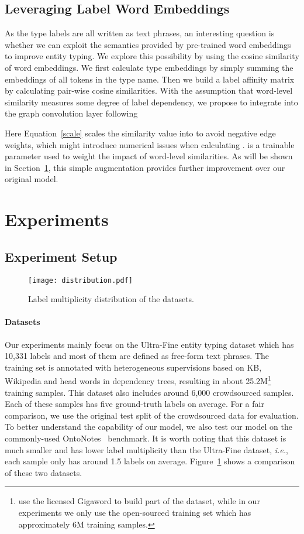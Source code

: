 \documentclass[11pt,a4paper]{article}
\begin{document}
\subsection{Leveraging Label Word Embeddings}
As the type labels are all written as text phrases, an interesting question is whether we can exploit the semantics provided by pre-trained word embeddings to improve entity typing. We explore this possibility by using the cosine similarity of word embeddings. We first calculate type embeddings by simply summing the embeddings of all tokens in the type name. Then we build a label affinity matrix  by calculating pair-wise cosine similarities. With the assumption that word-level similarity measures some degree of label dependency, we propose to integrate  into the graph convolution layer following

Here Equation~\ref{scale} scales the similarity value into  to avoid negative edge weights, which might introduce numerical issues when calculating .  is a trainable parameter used to weight the impact of word-level similarities. As will be shown in Section~\ref{exp}, this simple augmentation provides further improvement over our original model.

\section{Experiments}
\label{exp}
\subsection{Experiment Setup}

\begin{figure}[t]
\centering
\texttt{[image: distribution.pdf]}
\caption{Label multiplicity distribution of the datasets.}
\label{dataset}
\end{figure}

\paragraph{Datasets} Our experiments mainly focus on the Ultra-Fine entity typing dataset which has 10,331 labels and most of them are defined as free-form text phrases. The training set is annotated with heterogeneous supervisions based on KB, Wikipedia and head words in dependency trees, resulting in about 25.2M\footnote{\citet{choi2018ultra} use the licensed Gigaword to build part of the dataset, while in our experiments we only use the open-sourced training set which has approximately 6M training samples.} training samples. This dataset also includes around 6,000 crowdsourced samples. Each of these samples has five ground-truth labels on average. For a fair comparison, we use the original test split of the crowdsourced data for evaluation. To better understand the capability of our model, we also test our model on the commonly-used OntoNotes~\cite{gillick2014context} benchmark. It is worth noting that this dataset is much smaller and has lower label multiplicity than the Ultra-Fine dataset, \emph{i.e.}, each sample only has around 1.5 labels on average. Figure~\ref{dataset} shows a comparison of these two datasets. 
\end{document}
